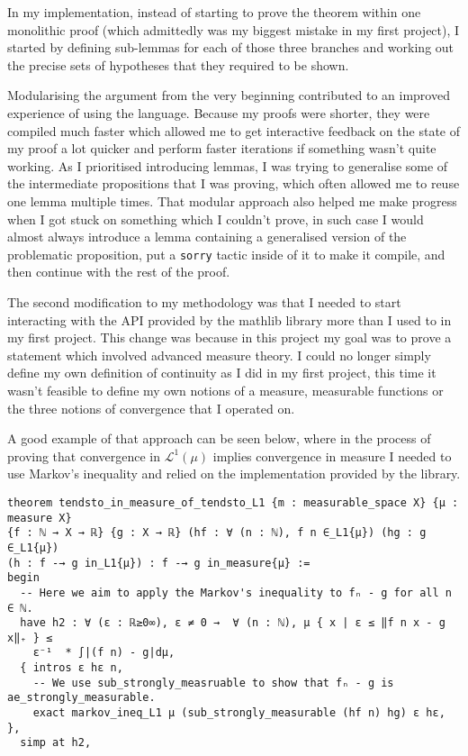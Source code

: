 \documentclass[11pt]{article}
\newenvironment{code}{\captionsetup{type=listing}}{}
\newcommand\Lmu{\mathcal{L}^1(\mu)}
\begin{document}
In my implementation, instead of starting to prove the theorem
within one monolithic proof (which admittedly was my biggest mistake in my first project),
I started by defining sub-lemmas for each of those three branches and working out
the precise sets of hypotheses that they required to be shown.

Modularising the argument from the very beginning contributed to an improved experience
of using the language. Because my proofs were shorter, they were compiled much
faster which allowed me to get interactive feedback on the state of my proof a lot
quicker and perform faster iterations if something wasn't quite working.
As I prioritised introducing lemmas, I
was trying to generalise some of the intermediate propositions that I was proving,
which often allowed me to reuse one lemma multiple times. That modular approach
also helped me make progress when I got stuck on something which I couldn't prove,
in such case I would almost always introduce a lemma containing a generalised version
of the problematic proposition, put a \texttt{sorry} tactic inside of it to make it
compile, and then continue with the rest of the proof.

The second modification to my methodology was that I needed to start
interacting with the API provided by the mathlib library more than I used to in
my first project. This change was because in this project my goal was to prove
a statement which involved advanced measure theory. I could no longer simply define
my own definition of continuity as I did in my first project, this
time it wasn't feasible to define my own notions of a measure, measurable
functions or the three notions of convergence that I operated on.

A good example of that approach can be seen below, where in the process of proving
that convergence in $\Lmu$ implies convergence in measure
I needed to use Markov's inequality and relied on the implementation provided by the library.

\begin{code}
\begin{verbatim}
theorem tendsto_in_measure_of_tendsto_L1 {m : measurable_space X} {μ : measure X}
{f : ℕ → X → ℝ} {g : X → ℝ} (hf : ∀ (n : ℕ), f n ∈_L1{μ}) (hg : g ∈_L1{μ})
(h : f -→ g in_L1{μ}) : f -→ g in_measure{μ} :=
begin
  -- Here we aim to apply the Markov's inequality to fₙ - g for all n ∈ ℕ.
  have h2 : ∀ (ε : ℝ≥0∞), ε ≠ 0 →  ∀ (n : ℕ), μ { x | ε ≤ ‖f n x - g x‖₊ } ≤
    ε⁻¹  * ∫|(f n) - g|dμ,
  { intros ε hε n,
    -- We use sub_strongly_measruable to show that fₙ - g is ae_strongly_measurable.
    exact markov_ineq_L1 μ (sub_strongly_measurable (hf n) hg) ε hε, },
  simp at h2,
\end{verbatim}
\end{code}
\end{document}
